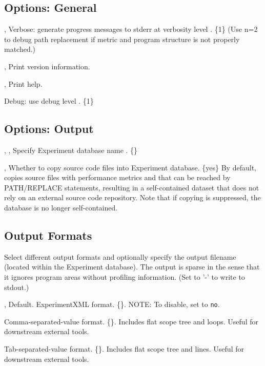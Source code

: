 \documentclass[english]{article}
\begin{document}
\subsection{Options: General}

\begin{Description}
\item[\OptoArg{-v}{n}, \OptoArg{--verbose}{n}] Verbose: generate progress messages to stderr at verbosity level .  \{1\}  (Use n=2 to debug path replacement if metric and program structure is not properly matched.)
\item[\Opt{-V}, \Opt{--version}] Print version information.
\item[\Opt{-h}, \Opt{--help}] Print help.
\item[\OptoArg{--debug}{n}]   Debug: use debug level . \{1\}
\end{Description}


\subsection{Options: Output}

\begin{Description}
  \item[\OptArg{-o}{db-path}, \OptArg{--db}{db-path}, \OptArg{--output}{db-path}] Specify Experiment database name .  \{\}
  \item[\OptoArg{--src}{yes \Bar\ no}, \OptoArg{--source}{yes \Bar\ no}] Whether to copy source code files into Experiment database. \{yes\} By default,  copies source files with performance metrics and that can be reached by PATH/REPLACE statements, resulting in a self-contained dataset that does not rely on an external source code repository.  Note that if copying is suppressed, the database is no longer self-contained.
\end{Description}

\subsection{Output Formats}

Select different output formats and optionally specify the output filename  (located within the Experiment database). The output is sparse in the sense that it ignores program areas without profiling information. (Set  to '-' to write to stdout.)

\begin{Description}
  \item[\OptoArg{-x}{fname}, \OptoArg{--experiment}{fname}] Default.  ExperimentXML format. \{\}.  NOTE: To disable, set  to \verb+no+.
  \item[\OptoArg{--csv}{fname}] Comma-separated-value format. \{\}. Includes flat scope tree and loops.  Useful for downstream external tools.
  \item[\OptoArg{--tsv}{fname}] Tab-separated-value format. \{\}. Includes flat scope tree and lines.  Useful for downstream external tools.
\end{Description}
\end{document}
